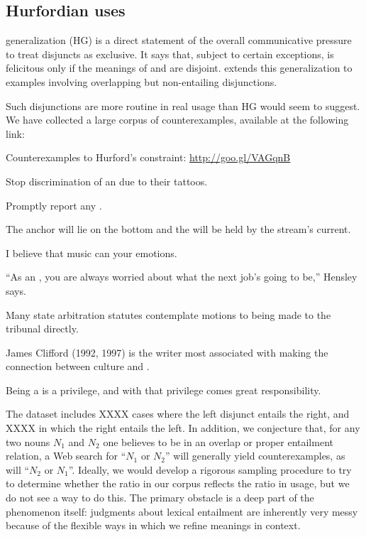 \documentclass{article}
\begin{document}

\subsection{Hurfordian uses}\label{sec:data:overlapping}

 generalization (HG) is a direct statement of
the overall communicative pressure to treat disjuncts as exclusive.
It says that, subject to certain exceptions,  is
felicitous only if the meanings of  and  are disjoint.
 extends this generalization to examples
involving overlapping but non-entailing disjunctions. 

Such disjunctions are more routine in real usage than HG would seem to
suggest. We have collected a large corpus of counterexamples,
available at the following link:
%
\begin{examples}
\item\label{ourcorpus} Counterexamples to Hurford's constraint: \url{http://goo.gl/VAGqnB}
  \begin{examples}
  \item Stop discrimination of an  due to their tattoos.
  \item Promptly report any .
  \item The anchor will lie on the bottom and the  will be held by the stream's current.
  \item I believe that music can  your emotions.
  \item ``As an , you are always worried about what the next job's going to be,'' Hensley says.
  \item Many state arbitration statutes contemplate motions to  being made to the tribunal directly.
  \item James Clifford (1992, 1997) is the writer most associated with making the connection between culture and .
  \item Being a  is a privilege, and with that privilege comes great responsibility.
  \end{examples}
\end{examples}
%
The dataset includes XXXX cases where the left disjunct entails the
right, and XXXX in which the right entails the left.  In addition, we
conjecture that, for any two nouns $N_{1}$ and $N_{2}$ one believes to
be in an overlap or proper entailment relation, a Web search for
``$N_{1}$ or $N_{2}$'' will generally yield counterexamples, as will
``$N_{2}$ or $N_{1}$''. Ideally, we would develop a rigorous sampling
procedure to try to determine whether the ratio in our corpus reflects
the ratio in usage, but we do not see a way to do this. The primary
obstacle is a deep part of the phenomenon itself: judgments about
lexical entailment are inherently very messy because of the flexible
ways in which we refine meanings in context.
\end{document}

